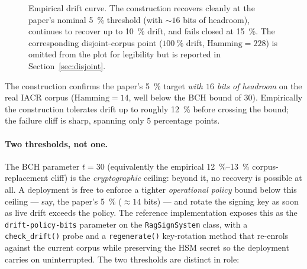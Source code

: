 \begin{figure}[h]
  \centering
  \caption{Empirical drift curve.  The construction recovers
  cleanly at the paper's nominal \SI{5}{\percent} threshold (with
  $\sim 16$ bits of headroom), continues to recover up to
  \SI{10}{\percent} drift, and fails closed at \SI{15}{\percent}.
  The corresponding disjoint\nobreakdash-corpus point ($\SI{100}{\percent}$
  drift, $\text{Hamming} = 228$) is omitted from the plot for
  legibility but is reported in
  Section~\ref{sec:disjoint}.}
  \label{fig:drift-curve}
\end{figure}

The construction confirms the paper's \SI{5}{\percent} target
\emph{with $16$ bits of headroom} on the real IACR corpus
($\text{Hamming} = 14$, well below the BCH bound of $30$).  Empirically
the construction tolerates drift up to roughly \SI{12}{\percent}
before crossing the bound; the failure cliff is sharp,
spanning only $5$ percentage points.

\paragraph{Two thresholds, not one.}  The BCH parameter $t = 30$
(equivalently the empirical \SIrange{12}{13}{\percent} corpus-replacement
cliff) is the \emph{cryptographic} ceiling: beyond it, no recovery is
possible at all.  A deployment is free to enforce a tighter
\emph{operational policy} bound below this ceiling — say, the paper's
\SI{5}{\percent} ($\approx 14$ bits) — and rotate the signing key as
soon as live drift exceeds the policy.  The reference implementation
exposes this as the
\texttt{drift\nobreakdash-policy\nobreakdash-bits} parameter on the
\texttt{RagSignSystem} class, with a
\texttt{check\_drift()} probe and a
\texttt{regenerate()} key\nobreakdash-rotation method that re\nobreakdash-enrols
against the current corpus while preserving the HSM secret so the
deployment carries on uninterrupted.  The two thresholds are
distinct in role:

